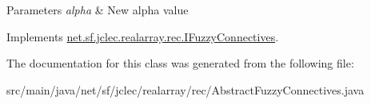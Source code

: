 \begin{DoxyParams}{Parameters}
{\em alpha} & New alpha value \\
\hline
\end{DoxyParams}


Implements \hyperlink{interfacenet_1_1sf_1_1jclec_1_1realarray_1_1rec_1_1_i_fuzzy_connectives_a33e828ad2d1f45c8485c7cc1c9512949}{net.\-sf.\-jclec.\-realarray.\-rec.\-I\-Fuzzy\-Connectives}.



The documentation for this class was generated from the following file\-:\begin{DoxyCompactItemize}
\item 
src/main/java/net/sf/jclec/realarray/rec/Abstract\-Fuzzy\-Connectives.\-java\end{DoxyCompactItemize}
